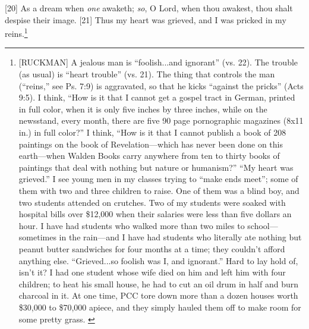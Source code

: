 [20] \textcolor[rgb]{0.00,0.00,1.00}{As a dream when \emph{one} awaketh; \emph{so}, O Lord, when thou awakest, thou shalt despise their image.}
[21] \textcolor[rgb]{0.00,0.00,1.00}{Thus my heart was grieved, and I was pricked in my reins.}\footnote{[RUCKMAN] A jealous man is “foolish...and ignorant” (vs. 22). The trouble (as usual) is “heart trouble” (vs. 21). The thing that controls the man (“reins,” see Ps. 7:9) is aggravated, so that he kicks “against the pricks” (Acts 9:5). I think, “How is it that I cannot get a gospel tract in German, printed in full color, when it is only five inches by three inches, while on the newsstand, every month, there are five 90 page pornographic magazines (8x11 in.) in full color?” I think, “How is it that I cannot publish a book of 208 paintings on the book of Revelation—which has never been done on this earth—when Walden Books carry anywhere from ten to thirty books of paintings that deal with nothing but nature or humanism?” “My heart was grieved.” I see young men in my classes trying to “make ends meet”; some of them with two and three children to raise. One of them was a blind boy, and two students attended on crutches. Two of my students were soaked with hospital bills over \$12,000 when their salaries were less than five dollars an hour. I have had students who walked more than two miles to school—sometimes in the rain—and I have had students who literally ate nothing but peanut butter sandwiches for four months at a time; they couldn’t afford anything else. “Grieved...so foolish was I, and ignorant.” Hard to lay hold of, isn’t it? I had one student whose wife died on him and left him with four children; to heat his small house, he had to cut an oil drum in half and burn charcoal in it. At one time, PCC tore down more than a dozen houses worth \$30,000 to \$70,000 apiece, and they simply hauled them off to make room for some pretty grass.  \cite{Ruckman1992Psalms}  }
